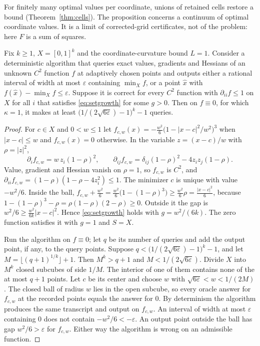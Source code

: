 For finitely many optimal values per coordinate, unions of retained cells
restore a bound (Theorem~\ref{thm:cells}). The proposition concerns a continuum of
optimal coordinate values. It is a limit of corrected-grid certificates, not
of the problem: here $F$ is a sum of squares.

\begin{proposition}\label{prop:oraclebarrier}
Fix $k\ge1$, $X=[0,1]^k$ and the coordinate-curvature bound $L=1$. Consider a
deterministic algorithm that queries exact values, gradients and Hessians of
an unknown $C^2$ function $f$ at adaptively chosen points and outputs either a
rational interval of width at most $\varepsilon$ containing $\min_Xf$, or a
point $\hat x$ with $f(\hat x)-\min_Xf\le\varepsilon$. Suppose it is correct
for every $C^2$ function with $\partial_{ii}f\le1$ on $X$ for all $i$ that
satisfies \eqref{eq:setgrowth} for some $g>0$. Then on $f\equiv0$, for which
$\kappa=1$, it makes at least $\bigl(1/(2\sqrt{6\varepsilon})-1\bigr)^k-1$
queries.
\end{proposition}

\begin{proof}
For $c\in X$ and $0<w\le1$ let
$f_{c,w}(x)=-\frac{w^2}6\bigl(1-|x-c|^2/w^2\bigr)^3$ when $|x-c|\le w$ and
$f_{c,w}(x)=0$ otherwise. In the variable $z=(x-c)/w$ with $\rho=|z|^2$,
\[
\partial_if_{c,w}=w\,z_i(1-\rho)^2,\qquad
\partial_{ij}f_{c,w}=\delta_{ij}(1-\rho)^2-4z_iz_j(1-\rho).
\]
Value, gradient and Hessian vanish on $\rho=1$, so $f_{c,w}$ is $C^2$, and
$\partial_{ii}f_{c,w}=(1-\rho)(1-\rho-4z_i^2)\le1$. The minimizer $c$ is
unique with value $-w^2/6$. Inside the ball,
$f_{c,w}+\frac{w^2}6=\frac{w^2}6\bigl(1-(1-\rho)^3\bigr)\ge\frac{w^2}6\rho
=\frac{|x-c|^2}6$, because $1-(1-\rho)^3-\rho=\rho(1-\rho)(2-\rho)\ge0$.
Outside it the gap is $w^2/6\ge\frac{w^2}{6k}|x-c|^2$. Hence
\eqref{eq:setgrowth} holds with $g=w^2/(6k)$. The zero function satisfies it
with $g=1$ and $S=X$.

Run the algorithm on $f\equiv0$; let $q$ be its number of queries and add
the output point, if any, to the query points. Suppose
$q<\bigl(1/(2\sqrt{6\varepsilon})-1\bigr)^k-1$, and let
$M=\lfloor(q+1)^{1/k}\rfloor+1$. Then $M^k>q+1$ and $M<1/(2\sqrt{6\varepsilon})$.
Divide $X$ into $M^k$ closed subcubes of side $1/M$. The interior of one of
them contains none of the at most $q+1$ points. Let $c$ be its center and
choose $w$ with $\sqrt{6\varepsilon}<w<1/(2M)$. The closed ball of radius $w$
lies in the open subcube, so every oracle answer for $f_{c,w}$ at the
recorded points equals the answer for $0$. By determinism the algorithm
produces the same transcript and output on $f_{c,w}$. An interval of width at
most $\varepsilon$ containing $0$ does not contain $-w^2/6<-\varepsilon$. An
output point outside the ball has gap $w^2/6>\varepsilon$ for $f_{c,w}$.
Either way the algorithm is wrong on an admissible function.
\end{proof}

